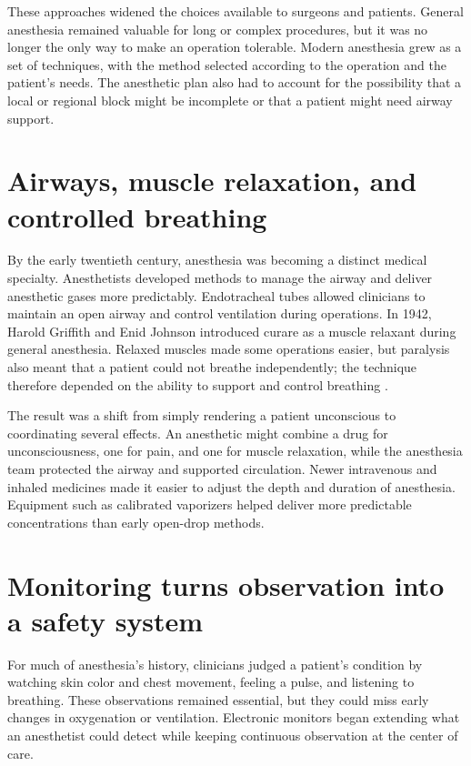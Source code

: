 \documentclass[12pt,oneside]{book}
\begin{document}
These approaches widened the choices available to surgeons and patients.
General anesthesia remained valuable for long or complex procedures, but it
was no longer the only way to make an operation tolerable. Modern anesthesia
grew as a set of techniques, with the method selected according to the
operation and the patient's needs. The anesthetic plan also had to account for
the possibility that a local or regional block might be incomplete or that a
patient might need airway support.

\section{Airways, muscle relaxation, and controlled breathing}
By the early twentieth century, anesthesia was becoming a distinct medical
specialty. Anesthetists developed methods to manage the airway and deliver
anesthetic gases more predictably. Endotracheal tubes allowed clinicians to
maintain an open airway and control ventilation during operations. In 1942,
Harold Griffith and Enid Johnson introduced curare as a muscle relaxant during
general anesthesia. Relaxed muscles made some operations easier, but paralysis
also meant that a patient could not breathe independently; the technique
therefore depended on the ability to support and control breathing
\cite{intubationhistory}.

The result was a shift from simply rendering a patient unconscious to
coordinating several effects. An anesthetic might combine a drug for
unconsciousness, one for pain, and one for muscle relaxation, while the
anesthesia team protected the airway and supported circulation. Newer
intravenous and inhaled medicines made it easier to adjust the depth and
duration of anesthesia. Equipment such as calibrated vaporizers helped
deliver more predictable concentrations than early open-drop methods.

\section{Monitoring turns observation into a safety system}
For much of anesthesia's history, clinicians judged a patient's condition by
watching skin color and chest movement, feeling a pulse, and listening to
breathing. These observations remained essential, but they could miss early
changes in oxygenation or ventilation. Electronic monitors began extending
what an anesthetist could detect while keeping continuous observation at the
center of care.
\end{document}
